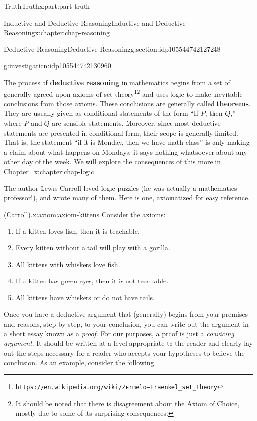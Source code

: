 \documentclass[oneside,10pt,]{book}
\newcommand{\xreffont}{\relax}
\newcommand{\terminology}[1]{\textbf{#1}}
\numberwithin{equation}{section}
\begin{document}
\begin{partptx}{Truth}{}{Truth}{}{}{x:part:part-truth}
\begin{chapterptx}{Inductive and Deductive Reasoning}{}{Inductive and Deductive Reasoning}{}{}{x:chapter:chap-reasoning}
\begin{sectionptx}{Deductive Reasoning}{}{Deductive Reasoning}{}{}{g:section:idp105544742127248}
\begin{investigation}{}{g:investigation:idp105544742130960}
\end{investigation}%
%
The process of \terminology{deductive reasoning} in mathematics begins from a set of generally agreed-upon axioms of \href{https://en.wikipedia.org/wiki/Zermelo–Fraenkel_set_theory}{set theory}\footnote{\nolinkurl{https://en.wikipedia.org/wiki/Zermelo–Fraenkel_set_theory}\label{g:fn:idp105544742535440}}\footnote{It should be noted that there is disagreement about the Axiom of Choice, mostly due to some of its surprising consequences.\label{g:fn:idp105544742535696}} and uses logic to make inevitable conclusions from those axioms. These conclusions are generally called \terminology{theorems}. They are usually given as conditional statements of the form ``If \(P\), then \(Q\),'' where \(P\) and \(Q\) are sensible statements. Moreover, since most deductive statements are presented in conditional form, their scope is generally limited. That is, the statement ``if it is Monday, then we have math class'' is only making a claim about what happens on Mondays; it says nothing whatsoever about any other day of the week. We will explore the consequences of this more in \hyperref[x:chapter:chap-logic]{Chapter~{\xreffont\ref{x:chapter:chap-logic}}}.%
\par
The author Lewis Carroll loved logic puzzles (he was actually a mathematics professor!), and wrote many of them. Here is one, axiomatized for easy reference.%
\begin{axiom}{(Carroll).}{}{x:axiom:axiom-kittens}%
Consider the axioms:%
%
\begin{enumerate}
\item{}If a kitten loves fish, then it is teachable.%
\item{}Every kitten without a tail will play with a gorilla.%
\item{}All kittens with whiskers love fish.%
\item{}If a kitten has green eyes, then it is not teachable.%
\item{}All kittens have whiskers or do not have tails.%
\end{enumerate}
\end{axiom}
Once you have a deductive argument that (generally) begins from your premises and reasons, step-by-step, to your conclusion, you can write out the argument in a short essay known as a \emph{proof}. For our purposes, a proof is just a \emph{convicing argument}. It should be written at a level appropriate to the reader and clearly lay out the steps necessary for a reader who accepts your hypotheses to believe the conclusion. As an example, consider the following.%

\end{sectionptx}
\end{chapterptx}
\end{partptx}
\end{document}
